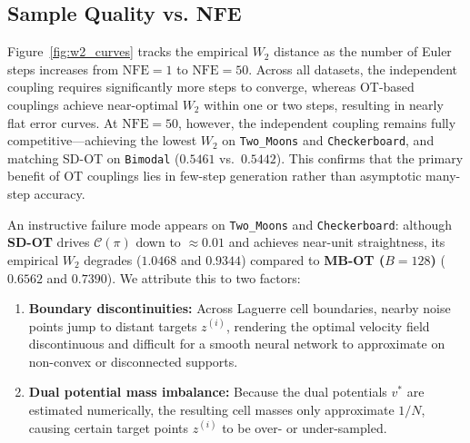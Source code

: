 \subsection{Sample Quality vs. NFE}

Figure~\ref{fig:w2_curves} tracks the empirical $W_2$ distance as the number of Euler steps increases from $\text{NFE}=1$ to $\text{NFE}=50$. Across all datasets, the independent coupling requires significantly more steps to converge, whereas OT-based couplings achieve near-optimal $W_2$ within one or two steps, resulting in nearly flat error curves. At $\text{NFE}=50$, however, the independent coupling remains fully competitive---achieving the lowest $W_2$ on \texttt{Two\_Moons} and \texttt{Checkerboard}, and matching SD-OT on \texttt{Bimodal} ($0.5461$ vs.\ $0.5442$). This confirms that the primary benefit of OT couplings lies in few-step generation rather than asymptotic many-step accuracy. 

An instructive failure mode appears on \texttt{Two\_Moons} and \texttt{Checkerboard}: although \textbf{SD-OT} drives $\mathcal{C}(\pi)$ down to $\approx 0.01$ and achieves near-unit straightness, its empirical $W_2$ degrades ($1.0468$ and $0.9344$) compared to \textbf{MB-OT ($B=128$)} ($0.6562$ and $0.7390$). We attribute this to two factors:
\begin{enumerate}
    \item \textbf{Boundary discontinuities:} Across Laguerre cell boundaries, nearby noise points jump to distant targets $z^{(i)}$, rendering the optimal velocity field discontinuous and difficult for a smooth neural network to approximate on non-convex or disconnected supports.
    \item \textbf{Dual potential mass imbalance:} Because the dual potentials $v^*$ are estimated numerically, the resulting cell masses only approximate $1/N$, causing certain target points $z^{(i)}$ to be over- or under-sampled. 
\end{enumerate}

